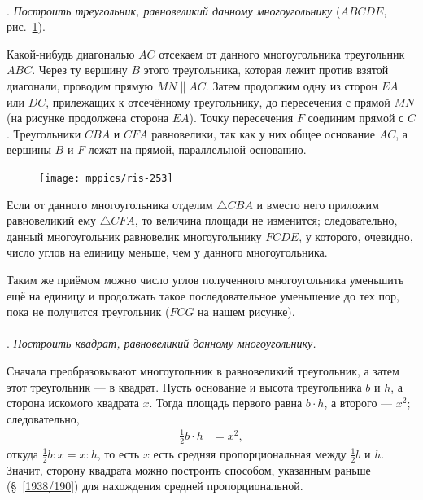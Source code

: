 \documentclass[twoside]{book}
\begin{document}
\paragraph{}\label{1938/254}
\mbox{.}
\emph{Построить треугольник, равновеликий данному многоугольнику} ($ABCDE$, рис.~\ref{1938/ris-253}).

Какой-нибудь диагональю $AC$ отсекаем от данного многоугольника треугольник $ABC$.
Через ту вершину $B$ этого треугольника, которая лежит против взятой диагонали, проводим прямую $MN\parallel AC$.
Затем продолжим одну из сторон $EA$ или $DC$, прилежащих к отсечённому треугольнику, до пересечения с прямой $MN$ (на рисунке продолжена сторона $EA$).
Точку пересечения $F$ соединим прямой с $C$.
Треугольники $CBA$ и $CFA$ равновелики, так как у них общее основание $AC$, а вершины $B$ и $F$ лежат на прямой, параллельной основанию.

\begin{figure}
\centering
\texttt{[image: mppics/ris-253]}
\caption{}\label{1938/ris-253}
\end{figure}

Если от данного многоугольника отделим $\triangle CBA$ и вместо него приложим равновеликий ему $\triangle CFA$, то величина площади не изменится;
следовательно, данный многоугольник равновелик многоугольнику $FCDE$, у которого, очевидно, число углов на единицу меньше, чем у данного многоугольника.

Таким же приёмом можно число углов полученного многоугольника уменьшить ещё на единицу и продолжать такое последовательное уменьшение до тех пор, пока не получится треугольник ($FCG$ на нашем рисунке).

\paragraph{}\label{1938/255}
.
\emph{Построить квадрат, равновеликий данному многоугольнику.}

{\sloppy

Сначала преобразовывают многоугольник в равновеликий треугольник, а затем этот треугольник — в квадрат.
Пусть основание и высота треугольника $b$ и $h$, а сторона искомого квадрата $x$.
Тогда площадь первого равна $b\cdot h$, а второго — $x^2$; 
следовательно,
\begin{align*}
\tfrac12 b\cdot h&=x^2,
\end{align*}
откуда
$\frac12 b:{x}=x:h$,
то есть $x$ есть средняя пропорциональная между $\tfrac12 b$ и $h$.
Значит, сторону квадрата можно построить способом, указанным раньше (§~\ref{1938/190}) для нахождения средней пропорциональной.

}
\end{document}

